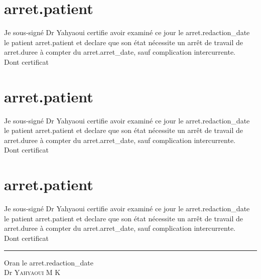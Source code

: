 \documentclass[12pt,a4paper]{article}
\begin{document}
                  \section{ {{arret.patient}} }
         Je sous-signé Dr Yahyaoui certifie avoir examiné ce jour le {{arret.redaction_date}} le patient {{arret.patient}} et declare que son
         état nécessite un arrêt de travail de {{arret.duree}} à compter du {{arret.arret_date}}, sauf complication intercurrente. \\
         Dont certificat
                  
                  \section{ {{arret.patient}} }
         Je sous-signé Dr Yahyaoui certifie avoir examiné ce jour le {{arret.redaction_date}} le patient {{arret.patient}} et declare que son
         état nécessite un arrêt de travail de {{arret.duree}} à compter du {{arret.arret_date}}, sauf complication intercurrente. \\
         Dont certificat
                 
                  \section{ {{arret.patient}} }
         Je sous-signé Dr Yahyaoui certifie avoir examiné ce jour le {{arret.redaction_date}} le patient {{arret.patient}} et declare que son
         état nécessite un arrêt de travail de {{arret.duree}} à compter du {{arret.arret_date}}, sauf complication intercurrente. \\
         Dont certificat
                  
                  \begin{center}
                    \rule{8cm}{0.4pt}
                  \end{center}
                  \vspace{2cm}
                  \flushbottom\raggedleft Oran le {{arret.redaction_date}}\\
                  \raggedleft Dr \textsc{Yahyaoui M K}\\
                
\end{document}
